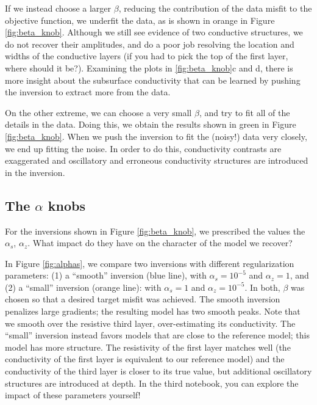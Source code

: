 \documentclass[11pt,oneside]{article}
\begin{document}
If we instead choose a larger $\beta$, reducing the contribution of the data misfit to the objective function, we underfit the data, as is shown in orange in Figure \ref{fig:beta_knob}. Although we still see evidence of two conductive structures, we do not recover their amplitudes, and do a poor job resolving the location and widths of the conductive layers (if you had to pick the top of the first layer, where should it be?). Examining the plots in \ref{fig:beta_knob}c and d, there is more insight about the subsurface conductivity that can be learned by pushing the inversion to extract more from the data.

On the other extreme, we can choose a very small $\beta$, and try to fit all of the details in the data. Doing this, we obtain the results shown in green in Figure \ref{fig:beta_knob}. When we push the inversion to fit the (noisy!) data very closely, we end up fitting the noise. In order to do this, conductivity contrasts are exaggerated and oscillatory and erroneous conductivity structures are introduced in the inversion.


\subsection{The $\alpha$ knobs}

For the inversions shown in Figure \ref{fig:beta_knob}, we prescribed the values the $\alpha_s$, $\alpha_z$. What impact do they have on the character of the model we recover?

In Figure \ref{fig:alphas}, we compare two inversions with different regularization parameters: (1) a ``smooth'' inversion (blue line), with $\alpha_s = 10^{-5}$ and $\alpha_z = 1$, and (2) a ``small'' inversion (orange line): with $\alpha_s = 1$ and $\alpha_z = 10^{-5}$. In both, $\beta$ was chosen so that a desired target misfit was achieved. The smooth inversion penalizes large gradients; the resulting model has two smooth peaks. Note that we smooth over the resistive third layer, over-estimating its conductivity. The ``small'' inversion instead favors models that are close to the reference model; this model has more structure. The resistivity of the first layer matches well (the conductivity of the first layer is equivalent to our reference model) and the conductivity of the third layer is closer to its true value, but additional oscillatory structures are introduced at depth. In the third notebook, you can explore the impact of these parameters yourself!
\end{document}
